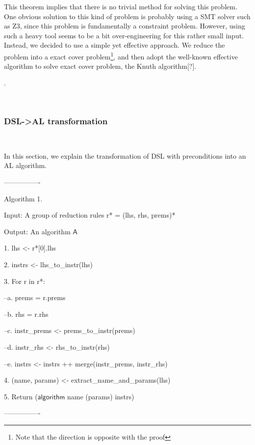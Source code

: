 This theorem implies that there is no trivial method for solving this problem.
One obvious solution to this kind of problem is probably using a SMT solver such as Z3, since
this problem is fundamentally a constraint problem.
However, using such a heavy tool seems to be a bit over-engineering for this rather small input.
Instead, we decided to use a simple yet effective approach.
We reduce the problem into a exact cover problem\footnote{Note that the direction is opposite with
the proof}, and then adopt the well-known effective algorithm to solve exact cover problem,
the Knuth algorithm[?].

.


~

\subsubsection{\textbf{DSL->AL transformation}}~

In this section, we explain the transformation of DSL with preconditions into an AL algorithm.

----------------

Algorithm 1.

Input: A group of reduction rules r* = (lhs, rhs, prems)*

Output: An algorithm $\mathsf{A}$

1. lhs <- r*[0].lhs

2. instrs <- lhs\_to\_instr(lhs)

3. For r in r*:

--a. prems = r.prems

--b. rhs = r.rhs

--c. instr\_prems <- prems\_to\_instr(prems)

--d. instr\_rhs <- rhs\_to\_instr(rhs)

--e. instrs <- instrs ++ merge(instr\_prems, instr\_rhs)

4. (name, params) <- extract\_name\_and\_params(lhs)

5. Return ($\mathsf{algorithm}$ name (params) {instrs})

----------------



